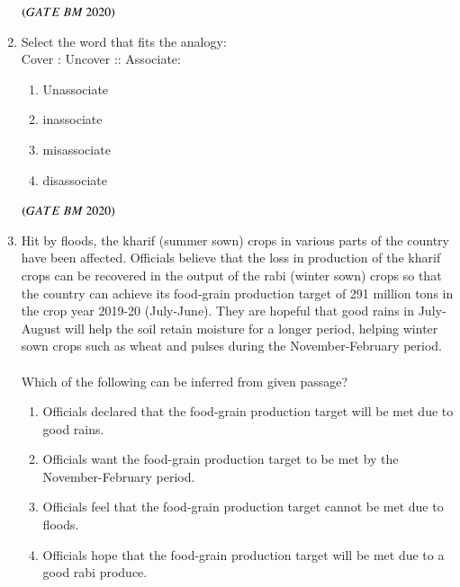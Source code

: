 \documentclass[journal,12pt,onecolumn]{IEEEtran}
\theoremstyle{remark}
\begin{document}
\begin{enumerate}
\begin{enumerate}
    \end{enumerate}
\hfill $\left(GATE\ BM\ 2020\right)$

\item Select the word that fits the analogy:
 \\Cover : Uncover :: Associate:\underline {\hspace{2cm}}\\
 \begin{enumerate}
     \item \hspace{0.5cm}Unassociate
     \item \hspace{0.5cm}inassociate
     \item \hspace{0.5cm}misassociate
     \item \hspace{0.5cm}disassociate
      \end{enumerate}
   \hfill $\left(GATE\ BM\ 2020\right)$ 

 \item Hit by floods, the kharif (summer sown) crops in various parts of the country have been affected. Officials believe that the loss in production of the kharif crops can be recovered in the output of the rabi (winter sown) crops so that the country can achieve its food-grain production target of 291 million tons in the crop year 2019-20 (July-June). They are hopeful that good rains in July-August will help the soil retain moisture for a longer period,
 helping winter sown crops such as wheat and pulses during the November-February period.\\
\\ Which of the following can be inferred from given passage?
 \begin{enumerate}
     \item \hspace{0.5cm}Officials declared that the food-grain production target will be met due to good rains.
     \item \hspace{0.5cm}Officials want the food-grain production target to be met by the November-February period.
     \item \hspace{0.5cm}Officials feel that the food-grain production target cannot be met due to floods.
     \item \hspace{0.5cm}Officials hope that the food-grain production target will be met due to a good rabi produce.\\
     

\end{enumerate}
\end{enumerate}
\end{document}
